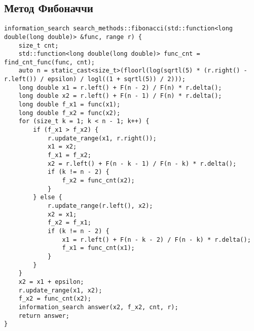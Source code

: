 \newpage
\subsection {Метод Фибоначчи} 
\begin{lstlisting}
information_search search_methods::fibonacci(std::function<long double(long double)> &func, range r) {
    size_t cnt;
    std::function<long double(long double)> func_cnt = find_cnt_func(func, cnt);
    auto n = static_cast<size_t>(floorl(log(sqrtl(5) * (r.right() - r.left()) / epsilon) / logl((1 + sqrtl(5)) / 2)));
    long double x1 = r.left() + F(n - 2) / F(n) * r.delta();
    long double x2 = r.left() + F(n - 1) / F(n) * r.delta();
    long double f_x1 = func(x1);
    long double f_x2 = func(x2);
    for (size_t k = 1; k < n - 1; k++) {
        if (f_x1 > f_x2) {
            r.update_range(x1, r.right());
            x1 = x2;
            f_x1 = f_x2;
            x2 = r.left() + F(n - k - 1) / F(n - k) * r.delta();
            if (k != n - 2) {
                f_x2 = func_cnt(x2);
            }
        } else {
            r.update_range(r.left(), x2);
            x2 = x1;
            f_x2 = f_x1;
            if (k != n - 2) {
                x1 = r.left() + F(n - k - 2) / F(n - k) * r.delta();
                f_x1 = func_cnt(x1);
            }
        }
    }
    x2 = x1 + epsilon;
    r.update_range(x1, x2);
    f_x2 = func_cnt(x2);
    information_search answer(x2, f_x2, cnt, r);
    return answer;
}
\end{lstlisting}
	

\newpage
